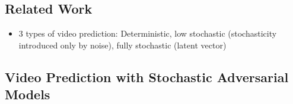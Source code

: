 \documentclass{article}
\begin{document}
    \subsection{Related Work}\label{subsec:Stochastic_Adversarial_Video_Prediction_(SAVP):related-work}
    \begin{itemize}
        \item 3 types of video prediction: Deterministic, low stochastic (stochasticity introduced only by noise), fully stochastic (latent vector)
    \end{itemize}

    \subsection{Video Prediction with Stochastic Adversarial Models}\label{subsec:Stochastic_Adversarial_Video_Prediction_(SAVP):video-prediction-with-stochastic-adversarial-models}
\end{document}
